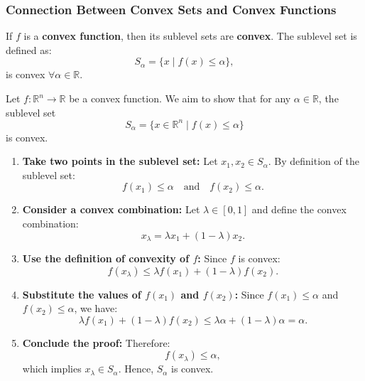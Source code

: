 \subsubsection{Connection Between Convex Sets and Convex Functions}
\begin{definition}
    If $f$ is a \textbf{convex function}, then its sublevel sets are \textbf{convex}. The sublevel set is defined as:
    \[
    S_\alpha = \{x \mid f(x) \leq \alpha\},
    \]
    is convex $\forall \alpha \in \mathbb{R}$.
\end{definition}

\begin{derivation}
    Let $f: \mathbb{R}^n \to \mathbb{R}$ be a convex function. We aim to show that for any $\alpha \in \mathbb{R}$, the sublevel set
    \[
    S_\alpha = \{x \in \mathbb{R}^n \mid f(x) \leq \alpha\}
    \]
    is convex.

    \begin{enumerate}
        \item \textbf{Take two points in the sublevel set:} Let $x_1, x_2 \in S_\alpha$. By definition of the sublevel set:
        \[
        f(x_1) \leq \alpha \quad \text{and} \quad f(x_2) \leq \alpha.
        \]

        \item \textbf{Consider a convex combination:} Let $\lambda \in [0, 1]$ and define the convex combination:
        \[
        x_\lambda = \lambda x_1 + (1 - \lambda)x_2.
        \]

        \item \textbf{Use the definition of convexity of \(f\):} Since $f$ is convex:
        \[
        f(x_\lambda) \leq \lambda f(x_1) + (1 - \lambda)f(x_2).
        \]

        \item \textbf{Substitute the values of \(f(x_1)\) and \(f(x_2)\):} Since $f(x_1) \leq \alpha$ and $f(x_2) \leq \alpha$, we have:
        \[
        \lambda f(x_1) + (1 - \lambda)f(x_2) \leq \lambda \alpha + (1 - \lambda)\alpha = \alpha.
        \]

        \item \textbf{Conclude the proof:} Therefore:
        \[
        f(x_\lambda) \leq \alpha,
        \]
        which implies $x_\lambda \in S_\alpha$. Hence, $S_\alpha$ is convex.

    \end{enumerate}

\end{derivation}


